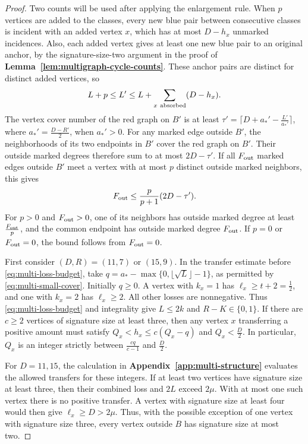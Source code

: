 \documentclass[preprint,11pt,numbers]{elsarticle-arxiv}
\numberwithin{equation}{section}
\theoremstyle{definition}
\begin{document}
\begin{proof}
Two counts will be used after applying the enlargement rule.
When $p$ vertices are added to the classes, every new blue pair
between consecutive classes is incident with an added vertex
$x$, which has at most $D-h_x$ unmarked incidences. Also, each
added vertex gives at least one new blue pair to an original
anchor, by the signature-size-two argument in the proof of
\textbf{Lemma~\ref{lem:multigraph-cycle-counts}}. These anchor
pairs are distinct for distinct added vertices, so
\begin{equation}\label{eq:multi-new-blue}
 L+p\le L'\le L+\sum_{x\ {\rm absorbed}}(D-h_x).
\end{equation}
The vertex cover number of the red graph on $B'$ is at least
$\tau'=\lceil D+a_*'-\frac{L'}{a_*'}\rceil$,
where $a_*'=\frac{D-R'}{2}$, when $a_*'>0$. For any marked
edge outside $B'$, the neighborhoods of its two endpoints in
$B'$ cover the red graph on $B'$. Their outside marked degrees
therefore sum to at most $2D-\tau'$. If all $F_{\rm out}$ marked
edges outside $B'$ meet a vertex with at most $p$ distinct
outside marked neighbors, this gives
\begin{equation}\label{eq:multi-center-cut}
 F_{\rm out}\le\frac{p}{p+1}(2D-\tau').
\end{equation}
For $p>0$ and $F_{\rm out}>0$, one of its neighbors has outside
marked degree at least $\frac{F_{\rm out}}{p}$, and the common
endpoint has outside marked degree $F_{\rm out}$. If $p=0$ or
$F_{\rm out}=0$, the bound follows from $F_{\rm out}=0$.

First consider $(D,R)=(11,7)$ or $(15,9)$. In the transfer
estimate before \eqref{eq:multi-loss-budget}, take
$q=a_*-\max\{0,\lfloor\sqrt{L}\rfloor-1\}$, as permitted by
\eqref{eq:multi-small-cover}.
Initially $q\ge0$. A vertex with $k_x=1$ has
$\ell_x\ge t+2=\frac{1}{2}$, and one with $k_x=2$ has
$\ell_x\ge2$. All other losses are nonnegative. Thus
\eqref{eq:multi-loss-budget} and integrality give $L\le2k$ and
$R-K\in\{0,1\}$. If there are $c\ge2$ vertices of signature
size at least three, then any vertex $x$ transferring a positive
amount must satisfy $Q_x<h_x\le c(Q_x-q)$ and $Q_x<\frac{D}{2}$.
In particular, $Q_x$ is an integer strictly between
$\frac{cq}{c-1}$ and $\frac{D}{2}$.

For $D=11,15$, the calculation in
\textbf{Appendix~\ref{app:multi-structure}} evaluates the allowed
transfers for these integers. If at least two vertices have
signature size at least three, then their combined loss and $2L$
exceed $2\mu$. With at most one such vertex there is no positive
transfer. A vertex with signature size at least four would then
give $\ell_x\ge D>2\mu$. Thus, with the possible exception of one
vertex with signature size three, every vertex outside $B$ has
signature size at most two.


\end{proof}
\end{document}
